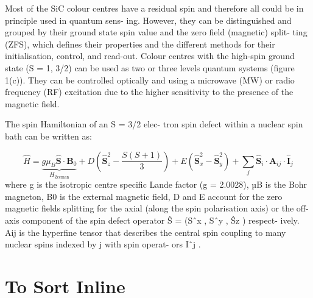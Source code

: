 \begin{group}
\color{lightgray}
Most of the SiC colour centres have a residual spin and
therefore all could be in principle used in quantum sens-
ing. However, they can be distinguished and grouped by their
ground state spin value and the zero field (magnetic) split-
ting (ZFS), which defines their properties and the different
methods for their initialisation, control, and read-out. Colour
centres with the high-spin ground state (S = 1, 3/2) can be
used as two or three levels quantum systems (figure 1(c)). They
can be controlled optically and using a microwave (MW) or
radio frequency (RF) excitation due to the higher sensitivity to
the presence of the magnetic field.


The spin Hamiltonian of an S = 3/2 elec-
tron spin defect within a nuclear spin bath can be written as:

\begin{equation}
    \hat{H} = \underbrace{g \mu_B \hat{\mathbf{S}} \cdot \mathbf{B}_0}_{H_{\text{Zeeman}}} + D \left( \hat{\mathbf{S}}_z^2 - \frac{S(S+1)}{3}\right) + E (\hat{\mathbf{S}}^2_x - \hat{\mathbf{S}}^2_y) + \sum_j \hat{\mathbf{S}}_i \cdot \mathbf{A}_{ij} \cdot \hat{\mathbf{I}}_j
    \label{eq:}
\end{equation}
where g is the isotropic centre specific Lande factor (g =
2.0028), µB is the Bohr magneton, B0 is the external magnetic
field, D and E account for the zero magnetic fields splitting
for the axial (along the spin polarisation axis) or the off-axis
component of the spin defect operator Ŝ = (Sˆx , Sˆy , Ŝz ) respect-
ively. Aij is the hyperfine tensor that describes the central spin
coupling to many nuclear spins indexed by j with spin operat-
ors Iˆj .
\end{group}


% 
% 
% 
% 
% 
% 
% 
% 
% 
% 
% 
% 
%
\clearpage
\section{To Sort Inline}

